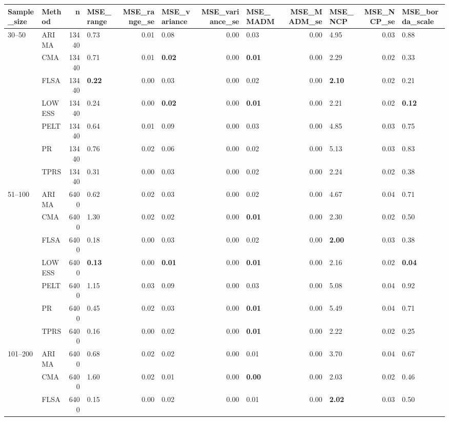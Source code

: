 \begin{table}[ht]
\centering
\begin{tabular}{llrlrlrlrlrl}
  \toprule
Sample_size & Method & n & MSE_range & MSE_range_se & MSE_variance & MSE_variance_se & MSE_MADM & MSE_MADM_se & MSE_NCP & MSE_NCP_se & MSE_borda_scale \\ 
  \midrule
30–50 & ARIMA & 13440 & 0.73 & 0.01 & 0.08 & 0.00 & 0.03 & 0.00 & 4.95 & 0.03 & 0.88 \\ 
   & CMA & 13440 & 0.71 & 0.01 & \textbf{0.02} & 0.00 & \textbf{0.01} & 0.00 & 2.29 & 0.02 & 0.33 \\ 
   & FLSA & 13440 & \textbf{0.22} & 0.00 & 0.03 & 0.00 & 0.02 & 0.00 & \textbf{2.10} & 0.02 & 0.21 \\ 
   & LOWESS & 13440 & 0.24 & 0.00 & \textbf{0.02} & 0.00 & \textbf{0.01} & 0.00 & 2.21 & 0.02 & \textbf{0.12} \\ 
   & PELT & 13440 & 0.64 & 0.01 & 0.09 & 0.00 & 0.03 & 0.00 & 4.85 & 0.03 & 0.75 \\ 
   & PR & 13440 & 0.76 & 0.02 & 0.06 & 0.00 & 0.02 & 0.00 & 5.13 & 0.03 & 0.83 \\ 
   & TPRS & 13440 & 0.31 & 0.00 & 0.03 & 0.00 & 0.02 & 0.00 & 2.24 & 0.02 & 0.38 \\ 
  51–100 & ARIMA & 6400 & 0.62 & 0.02 & 0.03 & 0.00 & 0.02 & 0.00 & 4.67 & 0.04 & 0.71 \\ 
   & CMA & 6400 & 1.30 & 0.02 & 0.02 & 0.00 & \textbf{0.01} & 0.00 & 2.30 & 0.02 & 0.50 \\ 
   & FLSA & 6400 & 0.18 & 0.00 & 0.03 & 0.00 & 0.02 & 0.00 & \textbf{2.00} & 0.03 & 0.38 \\ 
   & LOWESS & 6400 & \textbf{0.13} & 0.00 & \textbf{0.01} & 0.00 & \textbf{0.01} & 0.00 & 2.16 & 0.02 & \textbf{0.04} \\ 
   & PELT & 6400 & 1.15 & 0.03 & 0.09 & 0.00 & 0.03 & 0.00 & 5.08 & 0.04 & 0.92 \\ 
   & PR & 6400 & 0.45 & 0.02 & 0.03 & 0.00 & \textbf{0.01} & 0.00 & 5.49 & 0.04 & 0.71 \\ 
   & TPRS & 6400 & 0.16 & 0.00 & 0.02 & 0.00 & \textbf{0.01} & 0.00 & 2.22 & 0.02 & 0.25 \\ 
  101–200 & ARIMA & 6400 & 0.68 & 0.02 & 0.02 & 0.00 & 0.01 & 0.00 & 3.70 & 0.04 & 0.67 \\ 
   & CMA & 6400 & 1.60 & 0.02 & 0.01 & 0.00 & \textbf{0.00} & 0.00 & 2.03 & 0.02 & 0.46 \\ 
   & FLSA & 6400 & 0.15 & 0.00 & 0.02 & 0.00 & 0.01 & 0.00 & \textbf{2.02} & 0.03 & 0.50 \\ 

\end{tabular}
\end{table}
